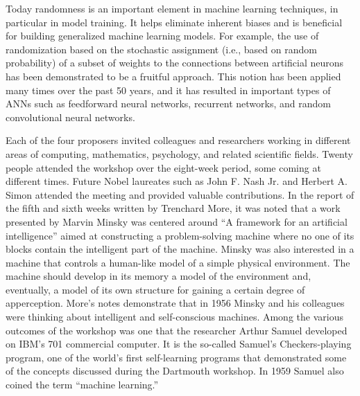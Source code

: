 Today randomness is an important element in machine learning techniques, in particular in model training. It helps eliminate inherent biases and is beneficial for building generalized machine learning models. For example, the use of randomization based on the stochastic assignment (i.e., based on random probability) of a subset of weights to the connections between artificial neurons has been demonstrated to be a fruitful approach. This notion has been applied many times over the past 50 years, and it has resulted in important types of ANNs such as feedforward neural networks, recurrent networks, and random convolutional neural networks.

Each of the four proposers invited colleagues and researchers working in different areas of computing, mathematics, psychology, and related scientific fields. Twenty people attended the workshop over the eight-week period, some coming at different times. Future Nobel laureates such as John F. Nash Jr. and Herbert A. Simon attended the meeting and provided valuable contributions. In the report of the fifth and sixth weeks written by Trenchard More, it was noted that a work presented by Marvin Minsky was centered around ``A framework for an artificial intelligence'' aimed at constructing a problem-solving machine where no one of its blocks contain the intelligent part of the machine. Minsky was also interested in a machine that controls a human-like model of a simple physical environment. The machine should develop in its memory a model of the environment and, eventually, a model of its own structure for gaining a certain degree of apperception. More's notes demonstrate that in 1956 Minsky and his colleagues were thinking about intelligent and self-conscious machines. Among the various outcomes of the workshop was one that the researcher Arthur Samuel developed on IBM's 701 commercial computer. It is the so-called Samuel's Checkers-playing program, one of the world's first self-learning programs that demonstrated some of the concepts discussed during the Dartmouth workshop. In 1959 Samuel also coined the term ``machine learning.''

